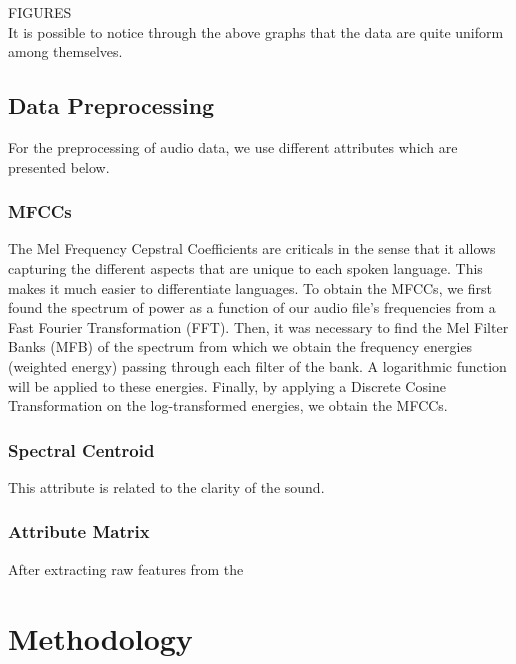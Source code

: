 \documentclass[11pt]{article}
\begin{document}
FIGURES\\

It is possible to notice through the above graphs that the data are quite uniform among themselves.


\subsection{Data Preprocessing}
For the preprocessing of audio data, we use different attributes which are presented below.

\subsubsection{MFCCs}
The Mel Frequency Cepstral Coefficients are criticals in the sense that it allows capturing the different aspects that are unique to each spoken language. This makes it much easier to differentiate languages. To obtain the MFCCs, we first found the spectrum of power as a function of our audio file's frequencies from a Fast Fourier Transformation (FFT). Then, it was necessary to find the Mel Filter Banks (MFB) of the spectrum from which we obtain the frequency energies (weighted energy) passing through each filter of the bank. A logarithmic function will be applied to these energies. Finally, by applying a Discrete Cosine Transformation on the log-transformed energies, we obtain the MFCCs.\\

\subsubsection{Spectral Centroid}
This attribute is related to the clarity of the sound.

\subsubsection{Attribute Matrix}
After extracting raw features from the 
\section{Methodology}
\end{document}
